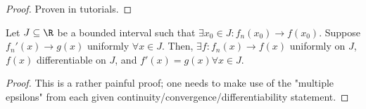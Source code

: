 \begin{proof}
    Proven in tutorials.
\end{proof}

\begin{theorem}
    Let $J \subseteq \R$ be a bounded interval such that $\exists x_0 \in J : f_n(x_0) \to f(x_0)$. Suppose $f_n'(x) \to g(x)$ uniformly $\forall x \in J$. Then, $\exists f : f_n(x) \to f(x)$ uniformly on $J$, $f(x)$ differentiable on $J$, and $f'(x) = g(x) \forall x \in J$.
\end{theorem}

\begin{proof}
    This is a rather painful proof; one needs to make use of the "multiple epsilons" from each given continuity/convergence/differentiability statement.
\end{proof}

